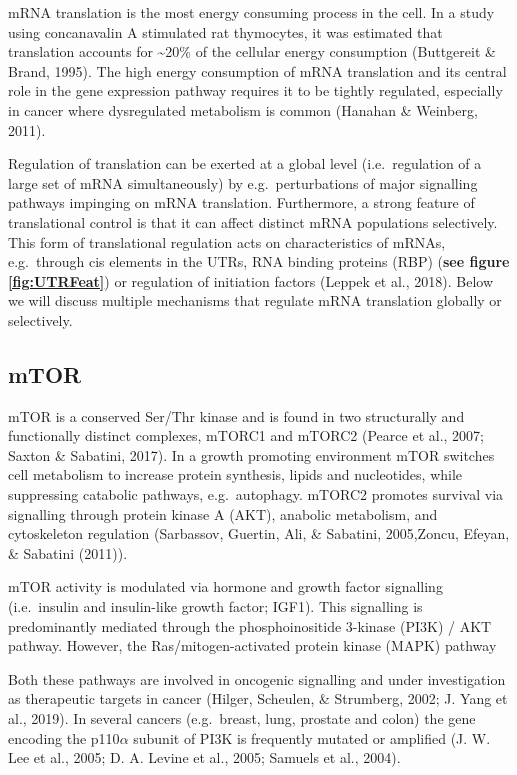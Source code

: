 \documentclass[12pt,openany]{book}
\begin{document}
mRNA translation is the most energy consuming process in the cell. In a
study using concanavalin A stimulated rat thymocytes, it was estimated
that translation accounts for \textasciitilde{}20\% of the cellular
energy consumption (Buttgereit \& Brand, 1995). The high energy
consumption of mRNA translation and its central role in the gene
expression pathway requires it to be tightly regulated, especially in
cancer where dysregulated metabolism is common (Hanahan \& Weinberg,
2011).

Regulation of translation can be exerted at a global level
(i.e.~regulation of a large set of mRNA simultaneously) by
e.g.~perturbations of major signalling pathways impinging on mRNA
translation. Furthermore, a strong feature of translational control is
that it can affect distinct mRNA populations selectively. This form of
translational regulation acts on characteristics of mRNAs, e.g.~through
cis elements in the UTRs, RNA binding proteins (RBP) (\textbf{see figure
\ref{fig:UTRFeat}}) or regulation of initiation factors (Leppek et al.,
2018). Below we will discuss multiple mechanisms that regulate mRNA
translation globally or selectively.

\subsection{mTOR} \label{mTOR}

mTOR is a conserved Ser/Thr kinase and is found in two structurally and
functionally distinct complexes, mTORC1 and mTORC2 (Pearce et al., 2007;
Saxton \& Sabatini, 2017). In a growth promoting environment mTOR
switches cell metabolism to increase protein synthesis, lipids and
nucleotides, while suppressing catabolic pathways, e.g.~autophagy.
mTORC2 promotes survival via signalling through protein kinase A (AKT),
anabolic metabolism, and cytoskeleton regulation (Sarbassov, Guertin,
Ali, \& Sabatini, 2005,Zoncu, Efeyan, \& Sabatini (2011)).

mTOR activity is modulated via hormone and growth factor signalling
(i.e.~insulin and insulin-like growth factor; IGF1). This signalling is
predominantly mediated through the phosphoinositide 3-kinase (PI3K) /
AKT pathway. However, the Ras/mitogen-activated protein kinase (MAPK)
pathway

Both these pathways are involved in oncogenic signalling and under
investigation as therapeutic targets in cancer (Hilger, Scheulen, \&
Strumberg, 2002; J. Yang et al., 2019). In several cancers (e.g.~breast,
lung, prostate and colon) the gene encoding the p110\(\alpha\) subunit
of PI3K is frequently mutated or amplified (J. W. Lee et al., 2005; D.
A. Levine et al., 2005; Samuels et al., 2004).
\end{document}
